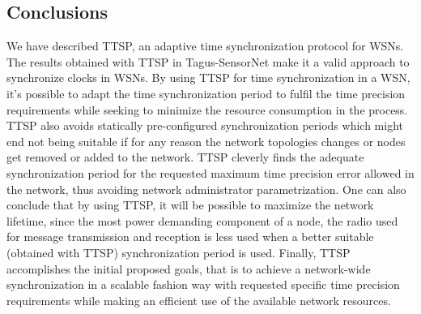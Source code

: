 \documentclass[11pt,a4]{article}
\begin{document}
\begin{multicols}{2}
\section{Conclusions}

We have described TTSP, an adaptive time synchronization protocol for WSNs. The results obtained with TTSP in Tagus-SensorNet make it a valid approach to synchronize clocks in WSNs. By using TTSP for time synchronization in a WSN, it's possible to adapt the time synchronization period to fulfil the time precision requirements while seeking to minimize the resource consumption in the process. TTSP also avoids statically pre-configured synchronization periods which might end not being suitable if for any reason the network topologies changes or nodes get removed or added to the network. TTSP cleverly finds the adequate synchronization period for the requested maximum time precision error allowed in the network, thus avoiding network administrator parametrization. One can also conclude that by using TTSP, it will be possible to maximize the network lifetime, since the most power demanding component of a node, the radio used for message transmission and reception is less used when a better suitable (obtained with TTSP) synchronization period is used. Finally, TTSP accomplishes the initial proposed goals, that is to achieve a network-wide synchronization in a scalable fashion way with requested specific time precision requirements while making an efficient use of the available network resources.


\end{multicols}
\end{document}
